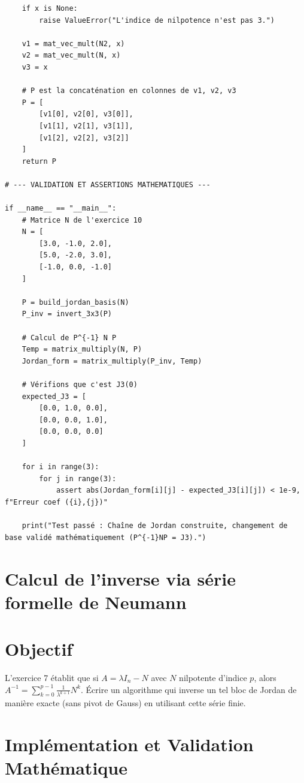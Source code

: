 \documentclass[11pt,a4paper]{article}
\begin{document}
\begin{lstlisting}
    if x is None:
        raise ValueError("L'indice de nilpotence n'est pas 3.")

    v1 = mat_vec_mult(N2, x)
    v2 = mat_vec_mult(N, x)
    v3 = x

    # P est la concaténation en colonnes de v1, v2, v3
    P = [
        [v1[0], v2[0], v3[0]],
        [v1[1], v2[1], v3[1]],
        [v1[2], v2[2], v3[2]]
    ]
    return P

# --- VALIDATION ET ASSERTIONS MATHEMATIQUES ---

if __name__ == "__main__":
    # Matrice N de l'exercice 10
    N = [
        [3.0, -1.0, 2.0],
        [5.0, -2.0, 3.0],
        [-1.0, 0.0, -1.0]
    ]

    P = build_jordan_basis(N)
    P_inv = invert_3x3(P)

    # Calcul de P^{-1} N P
    Temp = matrix_multiply(N, P)
    Jordan_form = matrix_multiply(P_inv, Temp)

    # Vérifions que c'est J3(0)
    expected_J3 = [
        [0.0, 1.0, 0.0],
        [0.0, 0.0, 1.0],
        [0.0, 0.0, 0.0]
    ]

    for i in range(3):
        for j in range(3):
            assert abs(Jordan_form[i][j] - expected_J3[i][j]) < 1e-9, f"Erreur coef ({i},{j})"

    print("Test passé : Chaîne de Jordan construite, changement de base validé mathématiquement (P^{-1}NP = J3).")

\end{lstlisting}


\section{Calcul de l'inverse via série formelle de Neumann}

\section{Objectif}
L'exercice 7 établit que si $A = \lambda I_n - N$ avec $N$ nilpotente d'indice $p$, alors $A^{-1} = \sum_{k=0}^{p-1} \frac{1}{\lambda^{k+1}} N^k$.
Écrire un algorithme qui inverse un tel bloc de Jordan de manière exacte (sans pivot de Gauss) en utilisant cette série finie.

\section{Implémentation et Validation Mathématique}
\end{document}
